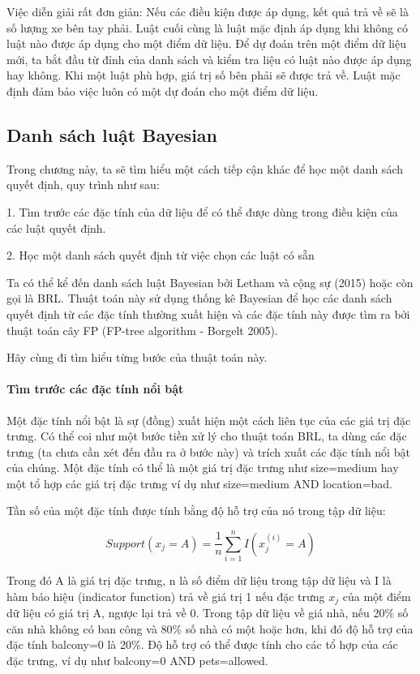 Việc diễn giải rất đơn giản: Nếu các điều kiện được áp dụng, kết quả trả về sẽ là số lượng xe bên tay phải. Luật cuối cùng là luật mặc định áp dụng khi không có luật nào được áp dụng cho một điểm dữ liệu. Để dự đoán trên một điểm dữ liệu mới, ta bắt đầu từ đỉnh của danh sách và kiểm tra liệu có luật nào được áp dụng hay không. Khi một luật phù hợp, giá trị số bên phải sẽ được trả về. Luật mặc định đảm bảo việc luôn có một dự đoán cho một điểm dữ liệu.

\subsection{Danh sách luật Bayesian}

Trong chương này, ta sẽ tìm hiểu một cách tiếp cận khác để học một danh sách quyết định, quy trình như sau:

1. Tìm trước các đặc tính của dữ liệu để có thể được dùng trong điều kiện của các luật quyết định.

2. Học một danh sách quyết định từ việc chọn các luật có sẵn

Ta có thể kể đến danh sách luật Bayesian bởi Letham và cộng sự (2015) hoặc còn gọi là BRL. Thuật toán này sử dụng thống kê Bayesian để học các danh sách quyết định từ các đặc tính thường xuất hiện và các đặc tính này được tìm ra bởi thuật toán cây FP (FP-tree algorithm - Borgelt 2005).

Hãy cùng đi tìm hiểu từng bước của thuật toán này.

\paragraph{Tìm trước các đặc tính nổi bật}

Một đặc tính nổi bật là sự (đồng) xuất hiện một cách liên tục của các giá trị đặc trưng. Có thể coi như một bước tiền xử lý cho thuật toán BRL, ta dùng các đặc trưng (ta chưa cần xét đến đầu ra ở bước này) và trích xuất các đặc tính nổi bật của chúng. Một đặc tính có thể là một giá trị đặc trưng như size=medium hay một tổ hợp các giá trị đặc trưng ví dụ như size=medium AND location=bad.

Tần số của một đặc tính được tính bằng độ hỗ trợ của nó trong tập dữ liệu:

$$Support(x_j=A)=\frac{1}n{}\sum_{i=1}^nI(x^{(i)}_{j}=A)$$

Trong đó A là giá trị đặc trưng, n là số điểm dữ liệu trong tập dữ liệu và I là hàm báo hiệu (indicator function) trả về giá trị 1 nếu đặc trưng $x_j$ của một điểm dữ liệu có giá trị A, ngược lại trả về 0. Trong tập dữ liệu về giá nhà, nếu 20\% số căn nhà không có ban công và 80\% số nhà có một hoặc hơn, khi đó độ hỗ trợ của đặc tính balcony=0 là 20\%. Độ hỗ trợ có thể được tính cho các tổ hợp của các đặc trưng, ví dụ như balcony=0 AND pets=allowed.

